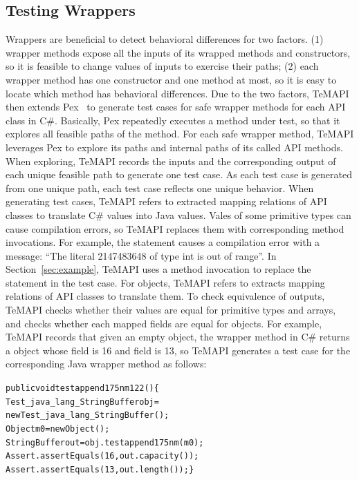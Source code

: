 \subsection{Testing Wrappers}
\label{sec:approach:single}
Wrappers are beneficial to detect behavioral differences for two factors. (1) wrapper methods expose all the inputs of its wrapped methods and constructors, so it is feasible to change values of inputs to exercise their paths; (2) each wrapper method has one constructor and one method at most, so it is easy to locate which method has behavioral differences. Due to the two factors, TeMAPI then extends Pex~\cite{tillmann2008pex} to generate test cases for safe wrapper methods for each API class in C\#. Basically, Pex repeatedly executes a method under test, so that it explores all feasible paths of the method. For each safe wrapper method, TeMAPI leverages Pex to explore its paths and internal paths of its called API methods. When exploring, TeMAPI records the inputs and the corresponding output of each unique feasible path to generate one test case. As each test case is generated from one unique path, each test case reflects one unique behavior. When generating test cases, TeMAPI refers to extracted mapping relations of API classes to translate C\# values into Java values. Vales of some primitive types can cause compilation errors, so TeMAPI replaces them with corresponding method invocations. For example, the  statement causes a compilation error with a message: ``The literal 2147483648 of type int is out of range''. In Section~\ref{sec:example}, TeMAPI uses a method invocation to replace the statement in the  test case. For objects, TeMAPI refers to extracts mapping relations of API classes to translate them. To check equivalence of outputs, TeMAPI checks whether their values are equal for primitive types and arrays, and checks whether each mapped fields are equal for objects. For example, TeMAPI records that given an empty object, the  wrapper method in C\# returns a  object whose  field is 16 and  field is 13, so TeMAPI generates a test case for the corresponding Java wrapper method as follows:

\begin{CodeOut}\vspace*{-1ex}
\begin{alltt}
public void testappend175nm122()\{
  Test_java_lang_StringBuffer obj =
      new Test_java_lang_StringBuffer();
  Object m0 = new Object();
  StringBuffer out = obj.testappend175nm(m0);
  Assert.assertEquals(16, out.capacity());	
  Assert.assertEquals(13, out.length());\}
\end{alltt}
\end{CodeOut}\vspace*{-2ex}

